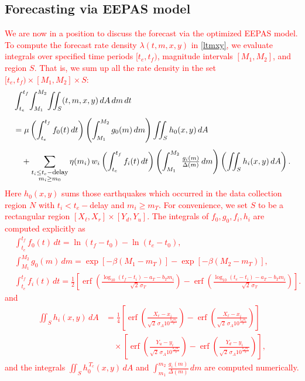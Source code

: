 \documentclass[extra,mreferee]{gji}
\theoremstyle{lemma}
\begin{document}
\subsection{Forecasting via EEPAS model}
\textcolor{red}{We are now in a position to discuss the forecast via the optimized EEPAS model. To compute the forecast rate density $\lambda(t, m, x, y)$ in \eqref{ltmxy}, we evaluate integrals over specified time periods $[t_e,t_f)$, magnitude intervals $[M_1,M_2]$, and region $S$. That is, we sum up all the rate density in the set $[t_e,t_f)\times [M_1,M_2]\times S$:
\begin{align*}
    &\int_{t_e}^{t_f} \!\int_{M_1}^{M_2} \!\iint_S (t, m, x, y)\, dA\, dm\, dt \\[1ex]
    &= \mu \left( \int_{t_e}^{t_f} f_0(t)\, dt \right) \left( \int_{M_1}^{M_2} g_0(m)\, dm \right) 
       \iint_S h_0(x, y)\, dA \\[1ex]
    &\quad + \sum_{\substack{t_i \le t_e-{\footnotesize\mbox{delay}}\\ m_i \ge m_0}} \eta(m_i)\, w_i
       \left( \int_{t_e}^{t_f} f_i(t)\, dt \right)
       \left( \int_{M_1}^{M_2} \tfrac{g_i(m)}{\Delta(m)}\, dm \right)
       \left( \iint_S h_i(x, y)\, dA \right).
\end{align*}
Here $h_0(x,y)$ sums those earthquakes which occurred in the data collection region $N$ with $t_i<t_e-$delay and $m_i\geq m_T$. For convenience, we set $S$ to be a rectangular region $[X_\ell,X_r]\times [Y_d,Y_u]$. The integrals of $f_0,g_0,f_i,h_i$ are computed explicitly as
\begin{align*}
&\int_{t_e}^{t_f} f_0(t)\, dt = \ln(t_f - t_0) - \ln(t_e - t_0), \\
&\int_{M_1}^{M_2} g_0(m)\, dm = \exp\!\left[-\beta(M_1 - m_T)\right] - \exp\!\left[-\beta(M_2 - m_T)\right],\\
&\int_{t_e}^{t_f} f_i(t)\, dt
 = \frac{1}{2} \left[
  \operatorname{erf}\!\left( \frac{\log_{10}(t_f - t_i) - a_T - b_T m_i}{\sqrt{2}\, \sigma_T} \right)
- \operatorname{erf}\!\left( \frac{\log_{10}(t_e - t_i) - a_T - b_T m_i}{\sqrt{2}\, \sigma_T} \right)
\right].
\end{align*}
and
\begin{align*}
\iint_S h_i(x, y)\, dA
&= \frac{1}{4}
\left[
  \operatorname{erf}\!\left( \frac{X_r - x_i}{\sqrt{2}\, \sigma_A 10^{\frac{b_A m_i}{2}}} \right)
- \operatorname{erf}\!\left( \frac{X_\ell - x_i}{\sqrt{2}\, \sigma_A 10^{\frac{b_A m_i}{2}}} \right)
\right] \\
&\quad \times
\left[
  \operatorname{erf}\!\left( \frac{Y_u - y_i}{\sqrt{2}\, \sigma_A 10^{\frac{b_A m_i}{2}}} \right)
- \operatorname{erf}\!\left( \frac{Y_d - y_i}{\sqrt{2}\, \sigma_A 10^{\frac{b_A m_i}{2}}} \right)
\right],
\end{align*}
and the integrals $\iint_S h_0^{\,T_c}(x, y)\, dA$ and $\int_{m_1}^{m_2} \tfrac{g_i(m)}{\Delta(m)}\, dm$ are computed numerically.}
\end{document}
